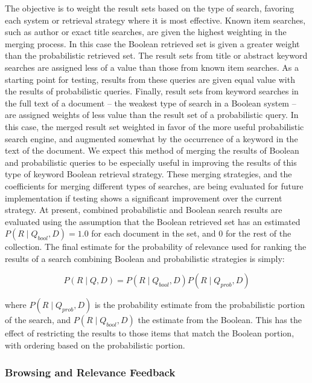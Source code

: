 The objective is to weight the result sets based on the type of
search, favoring each system or retrieval strategy where it is most
effective. Known item searches, such as author or exact title
searches, are given the highest weighting in the merging process.  In
this case the Boolean retrieved set is given a greater weight than the
probabilistic retrieved set.  The result sets from title or abstract
keyword searches are assigned less of a value than those from known
item searches.  As a starting point for testing, results from these
queries are given equal value with the results of probabilistic
queries.  Finally, result sets from keyword searches in the full text
of a document -- the weakest type of search in a Boolean system -- are
assigned weights of less value than the result set of a probabilistic
query. In this case, the merged result set weighted in favor of the
more useful probabilistic search engine, and augmented somewhat by the
occurrence of a keyword in the text of the document.  We expect this
method of merging the results of Boolean and probabilistic queries to
be especially useful in improving the results of this type of keyword
Boolean retrieval strategy. These merging strategies, and the
coefficients for merging different types of searches, are being
evaluated for future implementation if testing shows a significant
improvement over the current strategy. At present, combined
probabilistic and Boolean search results are evaluated using the
assumption that the Boolean retrieved set has an estimated $P(R \mid
Q_{bool},D) = 1.0$ for each document in the set, and $0$ for the rest
of the collection. The final estimate for the probability of relevance
used for ranking the results of a search combining Boolean and
probabilistic strategies is simply:

\begin{equation}
P(R \mid Q,D) = P(R \mid Q_{bool},D) P(R \mid Q_{prob},D) \nonumber
\end{equation}

where $P(R \mid Q_{prob},D)$ is the probability estimate from the
probabilistic portion of the search, and $P(R \mid Q_{bool},D)$ the
estimate from the Boolean. This has the effect of restricting the
results to those items that match the Boolean portion, with ordering
based on the probabilistic portion.

\subsubsection{Browsing and Relevance Feedback}

